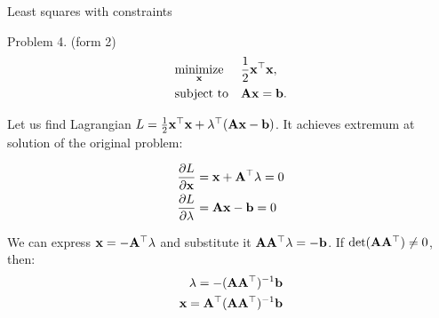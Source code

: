 \documentclass{beamer}
\begin{document}
\begin{frame}{Least squares with constraints}
	\begin{flushleft}
		
		
		Problem 4. (form 2)
		\begin{equation}
			\begin{aligned}
				& \underset{\mathbf{x}}{\text{minimize}}
				& & \frac{1}{2} \mathbf{x}^\top \mathbf{x}, \\
				& \text{subject to}
				& & \mathbf{A} \mathbf{x} = \mathbf{b}.
			\end{aligned}
		\end{equation}
		
		Let us find Lagrangian $L =\frac{1}{2} \mathbf{x}^\top \mathbf{x} + \lambda^\top ( \mathbf{A} \mathbf{x} - \mathbf{b})$. It achieves extremum at solution of the original problem:
		
		\begin{align}
			\frac{\partial L}{\partial \mathbf{x}} &=  \mathbf{x} + \mathbf{A}^\top  \lambda = 0 
			\\
			\frac{\partial L}{\partial \lambda} &=  \mathbf{A} \mathbf{x}- \mathbf{b} = 0
		\end{align}
		
		We can express $\mathbf{x} = -\mathbf{A}^\top  \lambda$ and substitute it $\mathbf{A} \mathbf{A}^\top  \lambda= -\mathbf{b}$. If $\text{det}(\mathbf{A} \mathbf{A}^\top ) \neq 0$, then:
		\begin{align}
			 \lambda= - (\mathbf{A} \mathbf{A}^\top )^{-1} \mathbf{b}
			 \\
			 \mathbf{x} = \mathbf{A}^\top  (\mathbf{A} \mathbf{A}^\top )^{-1} \mathbf{b}
		\end{align}		
		
	\end{flushleft}
\end{frame}
\end{document}
